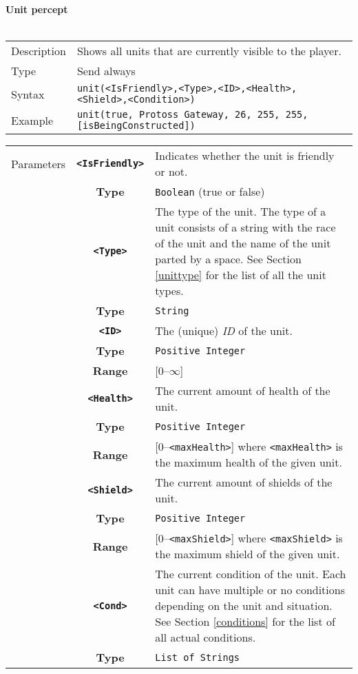 \newpage
\noindent
\textbf{Unit percept}\\
\\
\begin{tabularx}{\textwidth}{lX}
 Description & Shows all units that are currently visible to the player. \\
 Type & Send always \\
 Syntax & \verb|unit(<IsFriendly>,<Type>,<ID>,<Health>,<Shield>,<Condition>)| \\
 Example & \verb|unit(true, Protoss Gateway, 26, 255, 255, [isBeingConstructed])| \\ 
 \end{tabularx}
 \begin{tabularx}{\textwidth}{l | c | p{8cm}|}
 \cline{2-3} 
 Parameters & \textbf{\verb|<IsFriendly>|} & Indicates whether the unit is friendly or not. \\
            & \textbf{Type} & \verb|Boolean| (true or false) \\
            \cline{2-3} 
            & \textbf{\verb|<Type>|} & The type of the unit. The type of a unit consists of a string with the race of the unit and the name of the unit parted by a space. See Section \ref{unittype} for the list of all the unit types. \\
            & \textbf{Type} & \verb|String| \\
            \cline{2-3} 
            & \textbf{\verb|<ID>|} & The (unique) \textit{ID} of the unit.\\
            & \textbf{Type} & \verb|Positive Integer| \\
            & \textbf{Range} & [0--$\infty$] \\
            \cline{2-3} 
            & \textbf{\verb|<Health>|} & The current amount of health of the unit.\\
            & \textbf{Type} & \verb|Positive Integer| \\
            & \textbf{Range} & [0--\verb|<maxHealth>|] where \verb|<maxHealth>| is the maximum health of the given unit.\\
            \cline{2-3} 
            & \textbf{\verb|<Shield>|} & The current amount of shields of the unit. \\
            & \textbf{Type} & \verb|Positive Integer| \\
            & \textbf{Range} & [0--\verb|<maxShield>|] where \verb|<maxShield>| is the maximum shield of the given unit. \\
            \cline{2-3} 
            & \textbf{\verb|<Cond>|} & The current condition of the unit. Each unit can have multiple or no conditions depending on the unit and situation. See Section \ref{conditions} for the list of all actual conditions.\\ 
            & \textbf{Type} & \verb|List of Strings| \\
            \cline{2-3} 
\end{tabularx}\\
